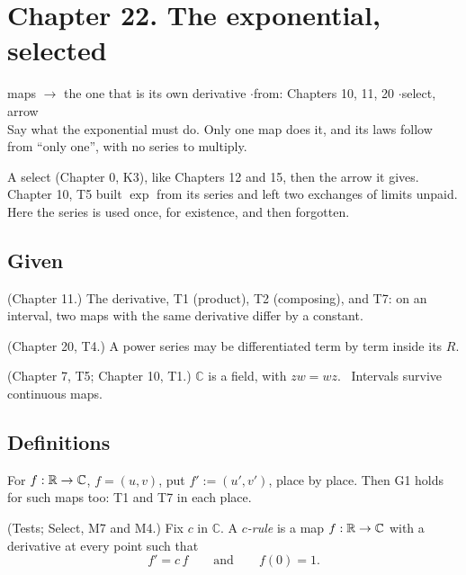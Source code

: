 \newpage

\section*{Chapter 22. The exponential, selected}
\begin{center}
{\normalsize maps $\to$ the one that is its own derivative \quad$\cdot$\quad from: Chapters 10, 11, 20 \quad$\cdot$\quad select, arrow}\\[4pt]
{\small Say what the exponential must do. Only one map does it, and its laws follow from ``only one'', with no series to multiply.}
\end{center}

A select (Chapter 0, K3), like Chapters 12 and 15, then the arrow it gives. Chapter 10, T5 built $\exp$ from its series and left two exchanges of limits unpaid. Here the series is used once, for existence, and then forgotten.

\subsection*{Given}

\begin{lines}
\item[\lab{G1}] (Chapter 11.) The derivative, T1 (product), T2 (composing), and T7: on an interval, two maps with the same derivative differ by a constant.
\item[\lab{G2}] (Chapter 20, T4.) A power series may be differentiated term by term inside its $R$.
\item[\lab{G3}] (Chapter 7, T5; Chapter 10, T1.) $\mathbb{C}$ is a field, with $z w = w z$. \ Intervals survive continuous maps.
\end{lines}

\subsection*{Definitions}

\begin{lines}
\item[\lab{D0}] For $f : \mathbb{R} \to \mathbb{C}$, $f = (u, v)$, put $f' := (u', v')$, place by place. Then G1 holds for such maps too: T1 and T7 in each place.
\item[\lab{D1}] (Tests; Select, M7 and M4.) Fix $c$ in $\mathbb{C}$. A \emph{$c$-rule} is a map $f : \mathbb{R} \to \mathbb{C}$ with a derivative at every point such that
\[
f' = c\,f \qquad\text{and}\qquad f(0) = 1 .
\]
\end{lines}

